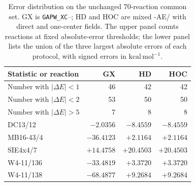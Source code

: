 \begin{table}[t]
\centering
\caption{Error distribution on the unchanged 70-reaction common set. GX is \texttt{GAPW\_XC}--\GTH{}; HD and HOC are mixed \GAPW{}-AE/\GTH{} with direct and one-center fields. The upper panel counts reactions at fixed absolute-error thresholds; the lower panel lists the union of the three largest absolute errors of each protocol, with signed errors in $\mathrm{kcal\,mol^{-1}}$.}
\label{tab:molecular-error-distribution}
\begin{tabular}{lrrr}
\toprule
Statistic or reaction & GX & HD & HOC \\
\midrule
Number with $|\Delta E|<1$ & 46 & 42 & 42 \\
Number with $|\Delta E|<2$ & 53 & 50 & 50 \\
Number with $|\Delta E|>5$ & 7 & 8 & 8 \\
\midrule
DC13/12 & $-2.0356$ & $-8.4559$ & $-8.4559$ \\
MB16-43/4 & $-36.4123$ & $+2.1164$ & $+2.1164$ \\
SIE4x4/7 & $+14.4758$ & $+20.4503$ & $+20.4503$ \\
W4-11/136 & $-33.4819$ & $+3.3720$ & $+3.3720$ \\
W4-11/138 & $-68.4877$ & $+9.2684$ & $+9.2684$ \\
\bottomrule
\end{tabular}
\end{table}
